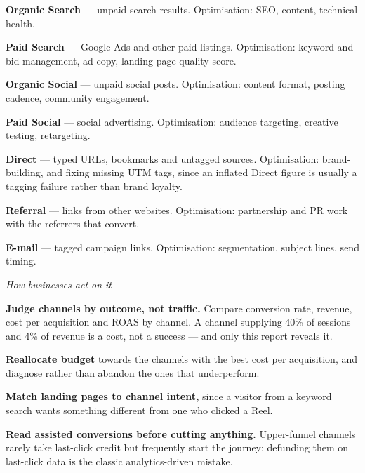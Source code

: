 \begin{qlist}
\begin{apts}
\item \textbf{Organic Search} --- unpaid search results. Optimisation: SEO,
      content, technical health.
\item \textbf{Paid Search} --- Google Ads and other paid listings. Optimisation:
      keyword and bid management, ad copy, landing-page quality score.
\item \textbf{Organic Social} --- unpaid social posts. Optimisation: content
      format, posting cadence, community engagement.
\item \textbf{Paid Social} --- social advertising. Optimisation: audience
      targeting, creative testing, retargeting.
\item \textbf{Direct} --- typed URLs, bookmarks and untagged sources.
      Optimisation: brand-building, and fixing missing UTM tags, since an
      inflated Direct figure is usually a tagging failure rather than brand
      loyalty.
\item \textbf{Referral} --- links from other websites. Optimisation: partnership
      and PR work with the referrers that convert.
\item \textbf{E-mail} --- tagged campaign links. Optimisation: segmentation,
      subject lines, send timing.
\end{apts}

\textit{How businesses act on it}
\begin{apts}\setcounter{enumi}{7}
\item \textbf{Judge channels by outcome, not traffic.} Compare conversion rate,
      revenue, cost per acquisition and ROAS by channel. A channel supplying
      40\% of sessions and 4\% of revenue is a cost, not a success --- and only
      this report reveals it.
\item \textbf{Reallocate budget} towards the channels with the best cost per
      acquisition, and diagnose rather than abandon the ones that
      underperform.
\item \textbf{Match landing pages to channel intent,} since a visitor from a
      keyword search wants something different from one who clicked a Reel.
\item \textbf{Read assisted conversions before cutting anything.} Upper-funnel
      channels rarely take last-click credit but frequently start the journey;
      defunding them on last-click data is the classic analytics-driven
      mistake.
\end{apts}


\end{qlist}
